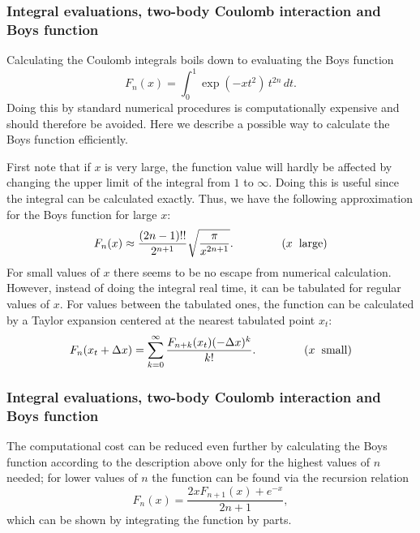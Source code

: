 {
  \frametitle{Integral evaluations, two-body Coulomb interaction and Boys function}
\begin{small}
{\scriptsize
Calculating the Coulomb integrals boils down to evaluating the Boys function
\begin{equation}
 F_n(x) = \int_0^1\exp(-xt^2)\,t^{2n}\,dt.
\end{equation}
Doing this by standard numerical procedures is computationally
expensive and should therefore be avoided. Here we describe a possible way to calculate the Boys function efficiently.

First note that if $x$ is very large, the function value will hardly be affected by changing the upper limit of the integral from $1$ to $\infty$. Doing this is useful
since the integral can be calculated exactly. Thus, we have the following approximation for the Boys function for large $x$:
\begin{equation}
 F_n(x) \approx \frac{(2n-1)!!}{2^{n+1}}\sqrt{\frac{\pi}{x^{2n+1}}}. \hspace{15mm} (x\hspace{2mm}\mathrm{large})
\end{equation}
For small values of $x$ there seems to be no escape from numerical calculation. However, instead of doing the integral real time, it can be tabulated for regular values of $x$.
For values between the tabulated ones, the function can be calculated by a Taylor expansion centered at the nearest tabulated point $x_t$:
\begin{equation}
 F_n(x_t+\Delta x) = \sum_{k=0}^\infty\frac{F_{n+k}(x_t) (-\Delta x)^k}{k!}. \hspace{15mm} (x\hspace{2mm}\mathrm{small})
\end{equation}
}
\end{small}
}
\frame
{
  \frametitle{Integral evaluations, two-body Coulomb interaction and Boys function}
\begin{small}
{\scriptsize
The computational cost can be reduced even further by calculating the Boys function according to the description above only for the highest values of $n$ needed; for lower values of $n$ the function
can be found via the recursion relation
\begin{equation}
 F_n(x) = \frac{2xF_{n+1}(x)+e^{-x}}{2n+1},
\end{equation}
which can be shown by integrating the function by parts.
}
\end{small}
}
\frame
